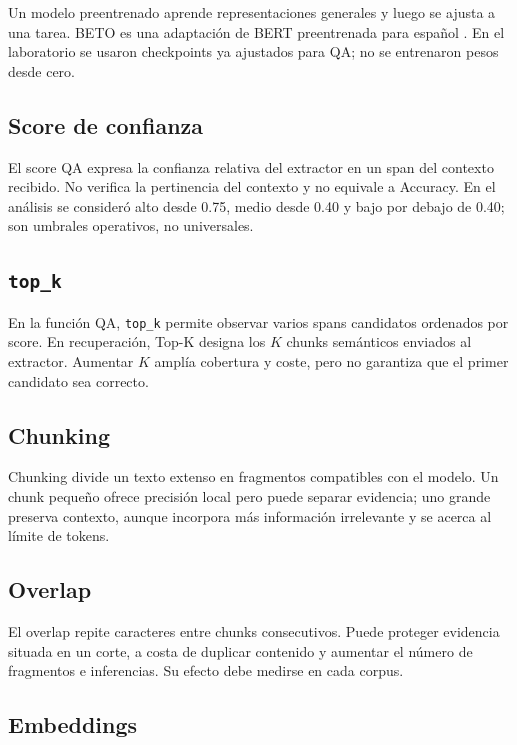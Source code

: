 \documentclass[12pt,letterpaper]{article}
\begin{document}
Un modelo preentrenado aprende representaciones generales y luego se ajusta a
una tarea. BETO es una adaptación de BERT preentrenada para español
\cite{canete2020}. En el laboratorio se usaron checkpoints ya ajustados para
QA; no se entrenaron pesos desde cero.

\subsection{Score de confianza}

El score QA expresa la confianza relativa del extractor en un span del
contexto recibido. No verifica la pertinencia del contexto y no equivale a
Accuracy. En el análisis se consideró alto desde 0.75, medio desde 0.40 y bajo
por debajo de 0.40; son umbrales operativos, no universales.

\subsection{\texorpdfstring{\texttt{top\_k}}{top k}}

En la función QA, \texttt{top\_k} permite observar varios spans candidatos
ordenados por score. En recuperación, Top-K designa los $K$ chunks semánticos
enviados al extractor. Aumentar $K$ amplía cobertura y coste, pero no garantiza
que el primer candidato sea correcto.

\subsection{Chunking}

Chunking divide un texto extenso en fragmentos compatibles con el modelo. Un
chunk pequeño ofrece precisión local pero puede separar evidencia; uno grande
preserva contexto, aunque incorpora más información irrelevante y se acerca al
límite de tokens.

\subsection{Overlap}

El overlap repite caracteres entre chunks consecutivos. Puede proteger
evidencia situada en un corte, a costa de duplicar contenido y aumentar el
número de fragmentos e inferencias. Su efecto debe medirse en cada corpus.

\subsection{Embeddings}
\end{document}

